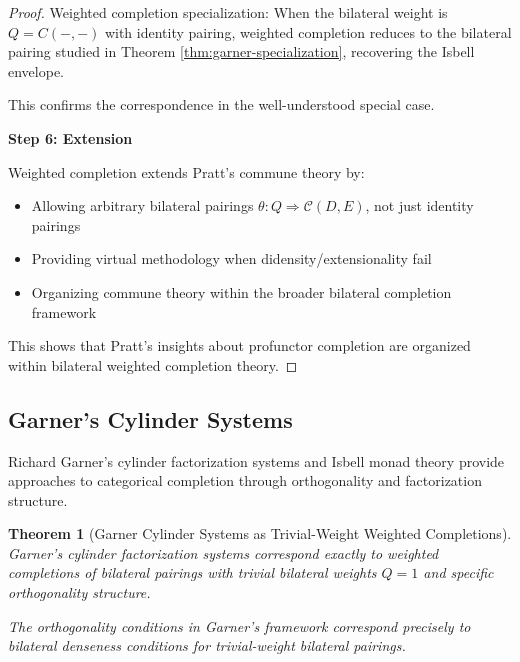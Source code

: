 \documentclass[11pt]{article}
\theoremstyle{plain}
\newtheorem{theorem}{Theorem}[section]
\theoremstyle{definition}
\theoremstyle{remark}
\begin{document}
\begin{proof}
Weighted completion specialization: When the bilateral weight is $Q = C(-, -)$ with identity pairing, weighted completion reduces to the bilateral pairing studied in Theorem \ref{thm:garner-specialization}, recovering the Isbell envelope.

This confirms the correspondence in the well-understood special case.

\textbf{Step 6: Extension}

Weighted completion extends Pratt's commune theory by:
\begin{itemize}
\item Allowing arbitrary bilateral pairings $\theta : Q \Rightarrow \mathcal{C}(D, E)$, not just identity pairings
\item Providing virtual methodology when didensity/extensionality fail
\item Organizing commune theory within the broader bilateral completion framework
\end{itemize}

This shows that Pratt's insights about profunctor completion are organized within bilateral weighted completion theory.
\end{proof}

\subsection{Garner's Cylinder Systems}

Richard Garner's cylinder factorization systems \cite{garner2018isbell} and Isbell monad theory provide approaches to categorical completion through orthogonality and factorization structure.

\begin{theorem}[Garner Cylinder Systems as Trivial-Weight Weighted Completions]\label{thm:garner-cylinder-correspondence}
Garner's cylinder factorization systems correspond exactly to weighted completions of bilateral pairings with trivial bilateral weights $Q = 1$ and specific orthogonality structure.

The orthogonality conditions in Garner's framework correspond precisely to bilateral denseness conditions for trivial-weight bilateral pairings.
\end{theorem}
\end{document}
